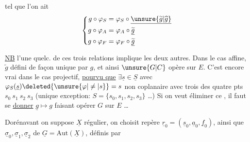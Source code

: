 tel que  l'on ait
\[
\left\{\begin{aligned}
g\circ\varphi_S&=\varphi_S\circ\underline{\unsure{\widetilde{g}|\widehat{g}}}\\
g\circ\varphi_A&=\varphi_A\circ\underline{\widetilde{g}}\\
g\circ\varphi_F&=\varphi_F\circ\underline{\widetilde{g}}
\end{aligned}\right.
\]

\uline{NB} l'une quelc. de ces trois relations implique les deux autres. Dans le cas affine, $\widetilde{g}$ défini de façon unique par $g$, et ainsi $\unsure{G|C}$ opère sur $E$. C'est encore vrai dans le cas projectif, \uline{pourvu que} $\exists\underline{s}\in\underline{S}$ avec $\varphi_S(\underline{s})\deleted{\unsure{\varphi|\ne|s}}=s$ non coplanaire avec trois des quatre pts $s_0\ s_1\ s_2\ s_3$ (unique exception:  $S=\{s_0,s_1,s_2,s_3\}$ \ldots)
Si on veut éliminer ce , il faut se \uline{donner} $\underline{g}\mapsto g$ faisant opérer $G$ sur $E$ \ldots

Dorénavant on suppose $\underline{X}$ régulier, on choisit repère $\underline{r}_0=(\underline{s}_0,\underline{a}_0,\underline{f}_0)$, ainsi que $\underline{\sigma}_0,\underline{\sigma}_1,\underline{\sigma}_2$ de $\underline{G}=\mathrm{Aut}(\underline{X})$, définis par
